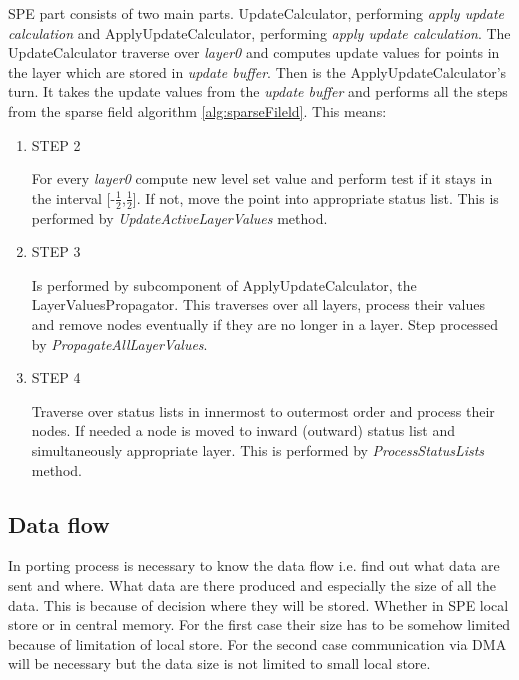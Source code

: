 SPE part consists of two main parts.
UpdateCalculator, performing \emph{apply update calculation} and ApplyUpdateCalculator, performing \emph{apply update calculation}.
The UpdateCalculator traverse over \emph{layer0} and computes update values for points in the layer which are stored in \emph{update buffer}.
Then is the ApplyUpdateCalculator's turn.
It takes the update values from the \emph{update buffer} and performs all the steps from the sparse field algorithm \ref{alg:sparseFileld}.
This means:
\begin{enumerate}
\item STEP 2
\par
For every \emph{layer0} compute new level set value and perform test if it stays in the interval [-$\frac{1}{2}$,$\frac{1}{2}$].
If not, move the point into appropriate status list.
This is performed by \emph{UpdateActiveLayerValues} method.

\item STEP 3
\par
Is performed by subcomponent of ApplyUpdateCalculator, the LayerValuesPropagator.
This traverses over all layers, process their values and remove nodes eventually if they are no longer in a layer.
Step processed by \emph{PropagateAllLayerValues}.

\item STEP 4
\par
Traverse over status lists in innermost to outermost order and process their
nodes. If needed a node is moved to inward (outward) status list and
simultaneously appropriate layer. This is performed by \emph{ProcessStatusLists}
method.
\end{enumerate}

\subsection{Data flow}

In porting process is necessary to know the data flow i.e. find out what data are sent and where.
What data are there produced and especially the size of all the data.
This is because of decision where they will be stored.
Whether in SPE local store or in central memory.
For the first case their size has to be somehow limited because of limitation of local store.
For the second case communication via DMA will be necessary but the data size is not limited to small local store.

